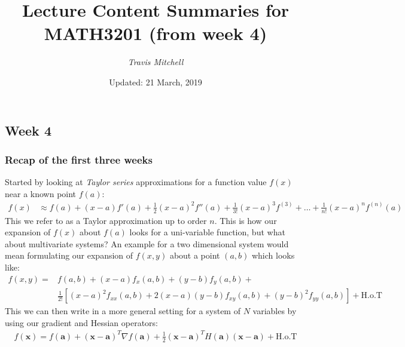 \documentclass[11pt,a4paper]{report}
\author{\textit{Travis Mitchell}}
\title{Lecture Content Summaries for MATH3201 (from week 4)}
\date{Updated: 21 March, 2019}
\begin{document}
\maketitle
\clearpage
\chapter{}
\section{Week 4}
	\subsection{Recap of the first three weeks}
		Started by looking at \textit{Taylor series} approximations for a function value $f(x)$ near a known point $f(a)$:
		\begin{align}
			f(x) &\approx f(a) + (x-a) f'(a) + \frac{1}{2} (x-a)^2 f''(a) + \frac{1}{3!} (x-a)^3 f^{(3)} + \dots + \frac{1}{n!} (x-a)^n f^{(n)}(a)
		\end{align}
		This we refer to as a Taylor approximation up to order $n$. This is how our expansion of $f(x)$ about $f(a)$ looks for a uni-variable function, but what about multivariate systems? An example for a two dimensional system would mean formulating our expansion of $f(x,y)$ about a point $(a,b)$ which looks like:
		\begin{align}
			f(x,y) = &f(a,b) + (x-a)f_x(a,b) + (y-b)f_y(a,b) + \nonumber \\ 
			&\frac{1}{2!} \left[ (x-a)^2 f_{xx}(a,b) + 2(x-a)(y-b)f_{xy}(a,b) + (y-b)^2 f_{yy}(a,b)\right] + \text{H.o.T}
		\end{align} 
		This we can then write in a more general setting for a system of $N$ variables by using our gradient and Hessian operators:
\newcommand{\ba}{\mathbf{a}}		\newcommand{\bx}{\mathbf{x}}
		\begin{align}
			f(\bx) = f(\ba) + (\bx - \ba)^T \nabla f(\ba) + \frac{1}{2} (\bx - \ba)^T H(\ba) (\bx - \ba) + \text{H.o.T}
		\end{align}
		
\end{document}
